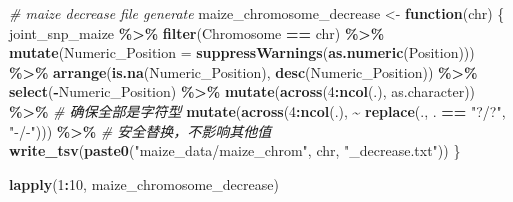 \documentclass[
]{article}
\newenvironment{Shaded}{\begin{snugshade}}{\end{snugshade}}
\newcommand{\AttributeTok}[1]{\textcolor[rgb]{0.13,0.29,0.53}{#1}}
\newcommand{\CommentTok}[1]{\textcolor[rgb]{0.56,0.35,0.01}{\textit{#1}}}
\newcommand{\ControlFlowTok}[1]{\textcolor[rgb]{0.13,0.29,0.53}{\textbf{#1}}}
\newcommand{\DecValTok}[1]{\textcolor[rgb]{0.00,0.00,0.81}{#1}}
\newcommand{\FunctionTok}[1]{\textcolor[rgb]{0.13,0.29,0.53}{\textbf{#1}}}
\newcommand{\NormalTok}[1]{#1}
\newcommand{\OtherTok}[1]{\textcolor[rgb]{0.56,0.35,0.01}{#1}}
\newcommand{\SpecialCharTok}[1]{\textcolor[rgb]{0.81,0.36,0.00}{\textbf{#1}}}
\newcommand{\StringTok}[1]{\textcolor[rgb]{0.31,0.60,0.02}{#1}}
\begin{document}
\begin{Shaded}
\begin{Highlighting}[]
\CommentTok{\# maize decrease file generate}
\NormalTok{maize\_chromosome\_decrease }\OtherTok{\textless{}{-}} \ControlFlowTok{function}\NormalTok{(chr) \{}
\NormalTok{  joint\_snp\_maize }\SpecialCharTok{\%\textgreater{}\%}
    \FunctionTok{filter}\NormalTok{(Chromosome }\SpecialCharTok{==}\NormalTok{ chr) }\SpecialCharTok{\%\textgreater{}\%}
    \FunctionTok{mutate}\NormalTok{(}\AttributeTok{Numeric\_Position =} \FunctionTok{suppressWarnings}\NormalTok{(}\FunctionTok{as.numeric}\NormalTok{(Position))) }\SpecialCharTok{\%\textgreater{}\%}  
    \FunctionTok{arrange}\NormalTok{(}\FunctionTok{is.na}\NormalTok{(Numeric\_Position), }\FunctionTok{desc}\NormalTok{(Numeric\_Position)) }\SpecialCharTok{\%\textgreater{}\%}
    \FunctionTok{select}\NormalTok{(}\SpecialCharTok{{-}}\NormalTok{Numeric\_Position) }\SpecialCharTok{\%\textgreater{}\%}
    \FunctionTok{mutate}\NormalTok{(}\FunctionTok{across}\NormalTok{(}\DecValTok{4}\SpecialCharTok{:}\FunctionTok{ncol}\NormalTok{(.), as.character)) }\SpecialCharTok{\%\textgreater{}\%}  \CommentTok{\# 确保全部是字符型}
    \FunctionTok{mutate}\NormalTok{(}\FunctionTok{across}\NormalTok{(}\DecValTok{4}\SpecialCharTok{:}\FunctionTok{ncol}\NormalTok{(.), }\SpecialCharTok{\textasciitilde{}} \FunctionTok{replace}\NormalTok{(., . }\SpecialCharTok{==} \StringTok{"?/?"}\NormalTok{, }\StringTok{"{-}/{-}"}\NormalTok{))) }\SpecialCharTok{\%\textgreater{}\%}  \CommentTok{\# 安全替换，不影响其他值}
    \FunctionTok{write\_tsv}\NormalTok{(}\FunctionTok{paste0}\NormalTok{(}\StringTok{"maize\_data/maize\_chrom"}\NormalTok{, chr, }\StringTok{"\_decrease.txt"}\NormalTok{))}
\NormalTok{\}}

\FunctionTok{lapply}\NormalTok{(}\DecValTok{1}\SpecialCharTok{:}\DecValTok{10}\NormalTok{, maize\_chromosome\_decrease)}
\end{Highlighting}
\end{Shaded}
\end{document}
